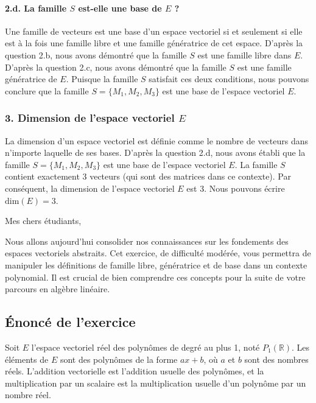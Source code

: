 \documentclass{report}
\begin{document}
\paragraph*{2.d. La famille $S$ est-elle une base de $E$ ?}

Une famille de vecteurs est une base d'un espace vectoriel si et seulement si elle est à la fois une famille libre et une famille génératrice de cet espace.
D'après la question 2.b, nous avons démontré que la famille $S$ est une famille libre dans $E$.
D'après la question 2.c, nous avons démontré que la famille $S$ est une famille génératrice de $E$.
Puisque la famille $S$ satisfait ces deux conditions, nous pouvons conclure que la famille $S = \{M_1, M_2, M_3\}$ est une base de l'espace vectoriel $E$.

\subsubsection*{3. Dimension de l'espace vectoriel $E$}

La dimension d'un espace vectoriel est définie comme le nombre de vecteurs dans n'importe laquelle de ses bases.
D'après la question 2.d, nous avons établi que la famille $S = \{M_1, M_2, M_3\}$ est une base de l'espace vectoriel $E$.
La famille $S$ contient exactement 3 vecteurs (qui sont des matrices dans ce contexte).
Par conséquent, la dimension de l'espace vectoriel $E$ est 3.
Nous pouvons écrire $\text{dim}(E) = 3$.

\newpage

Mes chers étudiants,

Nous allons aujourd'hui consolider nos connaissances sur les fondements des espaces vectoriels abstraits. Cet exercice, de difficulté modérée, vous permettra de manipuler les définitions de famille libre, génératrice et de base dans un contexte polynomial. Il est crucial de bien comprendre ces concepts pour la suite de votre parcours en algèbre linéaire.

\subsection*{Énoncé de l'exercice}

Soit $E$ l'espace vectoriel réel des polynômes de degré au plus 1, noté $P_1(\mathbb{R})$. Les éléments de $E$ sont des polynômes de la forme $ax+b$, où $a$ et $b$ sont des nombres réels. L'addition vectorielle est l'addition usuelle des polynômes, et la multiplication par un scalaire est la multiplication usuelle d'un polynôme par un nombre réel.
\end{document}
